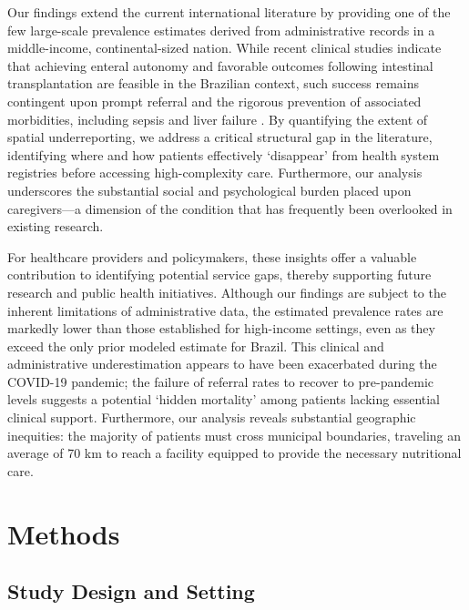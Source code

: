 \documentclass[12pt,a4paper]{article}
\theoremstyle{plain}
\theoremstyle{definition}
\theoremstyle{remark}
\begin{document}
Our findings extend the current international literature by providing one of the few large-scale prevalence estimates derived from administrative records in a middle-income, continental-sized nation. While recent clinical studies indicate that achieving enteral autonomy \cite{leite2025multicenter} and favorable outcomes following intestinal transplantation \cite{boteon2024multicentric} are feasible in the Brazilian context, such success remains contingent upon prompt referral and the rigorous prevention of associated morbidities, including sepsis and liver failure \cite{caporilli2023overview, pironi2023espen, cleminson2025gut}. By quantifying the extent of spatial underreporting, we address a critical structural gap in the literature, identifying where and how patients effectively `disappear' from health system registries before accessing high-complexity care. Furthermore, our analysis underscores the substantial social and psychological burden placed upon caregivers---a dimension of the condition that has frequently been overlooked in existing research. \cite{feng2026quality}

For healthcare providers and policymakers, these insights offer a valuable contribution to identifying potential service gaps, thereby supporting future research and public health initiatives. Although our findings are subject to the inherent limitations of administrative data, the estimated prevalence rates are markedly lower than those established for high-income settings, even as they exceed the only prior modeled estimate for Brazil.\cite{khokhar2025global} This clinical and administrative underestimation appears to have been exacerbated during the COVID-19 pandemic; the failure of referral rates to recover to pre-pandemic levels suggests a potential `hidden mortality' among patients lacking essential clinical support. Furthermore, our analysis reveals substantial geographic inequities: the majority of patients must cross municipal boundaries, traveling an average of 70 km to reach a facility equipped to provide the necessary nutritional care.



\section{Methods}\label{sec2}

\subsection*{Study Design and Setting}
\end{document}
